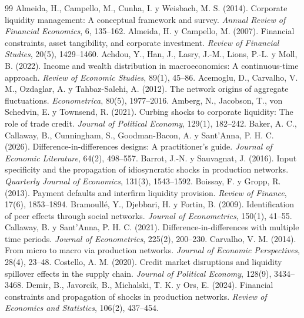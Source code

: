 \documentclass[11pt,a4paper]{article}
\begin{document}
\begin{thebibliography}{99}
 Almeida, H., Campello, M., Cunha, I. y Weisbach, M. S. (2014). Corporate liquidity management: A conceptual framework and survey. \emph{Annual Review of Financial Economics}, 6, 135--162.
 Almeida, H. y Campello, M. (2007). Financial constraints, asset tangibility, and corporate investment. \emph{Review of Financial Studies}, 20(5), 1429--1460.
 Achdou, Y., Han, J., Lasry, J.-M., Lions, P.-L. y Moll, B. (2022). Income and wealth distribution in macroeconomics: A continuous-time approach. \emph{Review of Economic Studies}, 89(1), 45--86.
 Acemoglu, D., Carvalho, V. M., Ozdaglar, A. y Tahbaz-Salehi, A. (2012). The network origins of aggregate fluctuations. \emph{Econometrica}, 80(5), 1977--2016.
 Amberg, N., Jacobson, T., von Schedvin, E. y Townsend, R. (2021). Curbing shocks to corporate liquidity: The role of trade credit. \emph{Journal of Political Economy}, 129(1), 182--242.
 Baker, A. C., Callaway, B., Cunningham, S., Goodman-Bacon, A. y Sant’Anna, P. H. C. (2026). Difference-in-differences designs: A practitioner’s guide. \emph{Journal of Economic Literature}, 64(2), 498--557.
 Barrot, J.-N. y Sauvagnat, J. (2016). Input specificity and the propagation of idiosyncratic shocks in production networks. \emph{Quarterly Journal of Economics}, 131(3), 1543--1592.
 Boissay, F. y Gropp, R. (2013). Payment defaults and interfirm liquidity provision. \emph{Review of Finance}, 17(6), 1853--1894.
 Bramoullé, Y., Djebbari, H. y Fortin, B. (2009). Identification of peer effects through social networks. \emph{Journal of Econometrics}, 150(1), 41--55.
 Callaway, B. y Sant’Anna, P. H. C. (2021). Difference-in-differences with multiple time periods. \emph{Journal of Econometrics}, 225(2), 200--230.
 Carvalho, V. M. (2014). From micro to macro via production networks. \emph{Journal of Economic Perspectives}, 28(4), 23--48.
 Costello, A. M. (2020). Credit market disruptions and liquidity spillover effects in the supply chain. \emph{Journal of Political Economy}, 128(9), 3434--3468.
 Demir, B., Javorcik, B., Michalski, T. K. y Ors, E. (2024). Financial constraints and propagation of shocks in production networks. \emph{Review of Economics and Statistics}, 106(2), 437--454.

\end{thebibliography}
\end{document}
